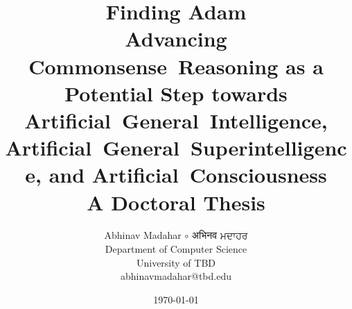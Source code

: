 \title{
    {\huge \textbf{Finding Adam}} \\
    Advancing Commonsense~Reasoning as a Potential Step towards Artificial~General~Intelligence, Artificial~General~Superintelligence, and Artificial~Consciousness
    \vspace{1cm} \\
    A Doctoral Thesis}

\author{
    Abhinav Madahar $\circ$ {\devanagari अभिनव } {\gurmukhi ਮਦਾਹਰ} \\
    Department of Computer Science \\
    University of TBD \\
    {\small abhinavmadahar@tbd.edu}}

\date{\today}

\maketitle{}
